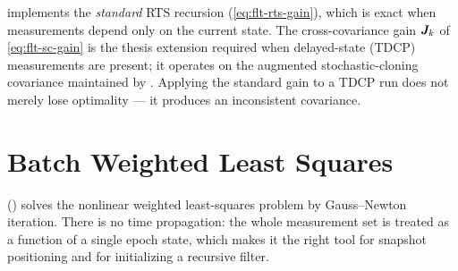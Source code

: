 \begin{lupntnote}
 implements the \emph{standard} RTS recursion
(\cref{eq:flt-rts-gain}), which is exact when measurements depend only on the
current state. The cross-covariance gain $\bm{J}_k$ of
\cref{eq:flt-sc-gain} is the thesis extension required when delayed-state
(TDCP) measurements are present; it operates on the augmented
stochastic-cloning covariance maintained by .
Applying the standard gain to a TDCP run does not merely lose optimality --- it
produces an inconsistent covariance.
\end{lupntnote}

\section{Batch Weighted Least Squares}
\label{sec:flt-batch}

 () solves
the nonlinear weighted least-squares problem by Gauss--Newton iteration. There
is no time propagation: the whole measurement set is treated as a function of a
single epoch state, which makes it the right tool for snapshot positioning and
for initializing a recursive filter.

